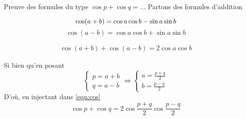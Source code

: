 \documentclass{article}
\begin{document}
\begin{question_kholle}{Preuve des formules du type $\cos p + \cos q = \dots$}
	Partons des formules d'addition

	$$
		\cos (a+b) = \cos a\cos b-\sin a\sin b\\
	$$
	$$
		\cos (a-b) = \cos a\cos b+\sin a\sin b
	$$

	\begin{align*}
		\cos(a+b) + \cos (a-b) = 2\cos a\cos b
		\tag{$\spadesuit$}\label{eqn:cos}
	\end{align*}


	Si bien qu'en posant
	$$
		\left\{ \begin{array}{ll}
			p = a+b \\
			q= a-b
		\end{array}\right.
		\iff
		\left\{ \begin{array}{ll}
			a = \frac{p+q}{2} \\
			b= \frac{p-q}{2}
		\end{array}\right.
	$$
	D'où, en injectant dans \eqref{eqn:cos}
	$$
		\cos p + \cos q = 2\cos \frac{p+q}{2} \cos \frac{p-q}{2}
	$$

\end{question_kholle}
\end{document}

